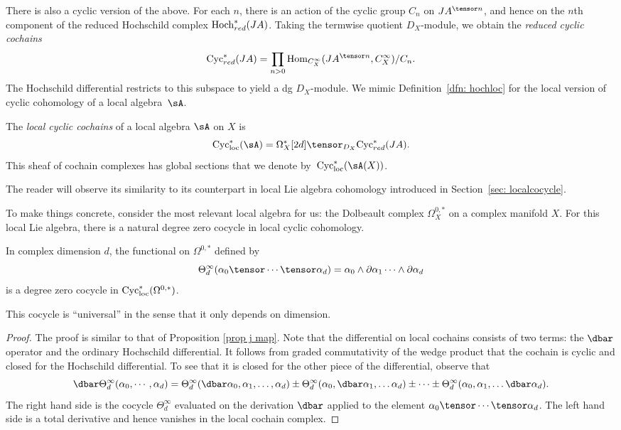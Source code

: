 There is also a cyclic version of the above. 
For each $n$, there is an action of the cyclic group $C_n$ on $JA^{\tensor n}$,
and hence on the $n$th component of the reduced Hochschild complex ${\rm Hoch}_{red}^* (JA)$.
Taking the termwise quotient $D_X$-module, we obtain the {\em reduced cyclic cochains}
\[
\Cyc_{red}^* (JA) = \prod_{n > 0} {\rm Hom}_{C^\infty_X} (JA^{\tensor n}, C^\infty_X) / C_n .
\]
The Hochschild differential restricts to this subspace to yield a dg $D_X$-module. 
We mimic Definition~\ref{dfn: hochloc} for the local version of cyclic cohomology of a local algebra~$\sA$. 

\begin{dfn}\label{dfn: cycloc}
The {\em local cyclic cochains} of a local algebra $\sA$ on $X$ is 
\[
\Cycloc^*(\sA) = \Omega^*_X[2d] \tensor_{D_X} \Cyc^*_{red} (JA) .
\] 
This sheaf of cochain complexes has global sections that we denote by~$\Cycloc^*(\sA(X))$.
\end{dfn}

The reader will observe its similarity to its counterpart in local Lie algebra cohomology introduced in Section~\ref{sec: localcocycle}. 

To make things concrete, 
consider the most relevant local algebra for us: the Dolbeault complex $\Omega^{0,*}_X$ on a complex manifold $X$. 
For this local Lie algebra, there is a natural degree zero cocycle in local cyclic cohomology.

\begin{lem}
\label{lem: univ}
In complex dimension $d$, 
the functional on $\Omega^{0,*}$ defined by
\[
\Theta^\infty_d (\alpha_0 \tensor \cdots \tensor \alpha_d) = \alpha_0 \wedge \partial \alpha_1 \cdots \wedge \partial \alpha_d
\]
is a degree zero cocycle in ${\rm Cyc}_{\rm loc}^*(\Omega^{0,*})$. 
\end{lem}

This cocycle is ``universal'' in the sense that it only depends on dimension.

\begin{proof}
The proof is similar to that of Proposition \ref{prop j map}. 
Note that the differential on local cochains consists of two terms: the $\dbar$ operator and the ordinary Hochschild differential. 
It follows from graded commutativity of the wedge product that the cochain is cyclic and closed for the Hochschild differential. 
To see that it is closed for the other piece of the differential, observe that
\[
\dbar \Theta^\infty_d(\alpha_0,\cdots,\alpha_d) = \Theta^\infty_d(\dbar \alpha_0, \alpha_1,\ldots,\alpha_d) \pm \Theta_d^\infty(\alpha_0, \dbar \alpha_1,\ldots \alpha_d) \pm \cdots \pm \Theta_d^\infty(\alpha_0, \alpha_1,\ldots \dbar \alpha_d) .
\]
The right hand side is the cocycle $\Theta_d^\infty$ evaluated on the derivation $\dbar$ applied to the element $\alpha_0 \tensor \cdots \tensor \alpha_d$. 
The left hand side is a total derivative and hence vanishes in the local cochain complex. 
\end{proof}

